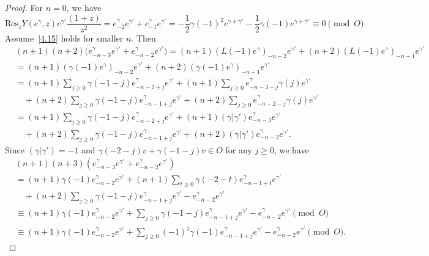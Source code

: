 \documentclass[10pt,a4paper]{amsart}
\def \ga {\gamma}
\def\Res{\mathrm{Res}}
\begin{document}
\begin{proof}
		For $n=0$, we have
		\[
		\Res_z Y(e^\ga,z)e^{\ga'}\frac{(1+z)}{z^{2}}
		= e^\ga_{-2}e^{\ga'}+e^\ga_{-1}e^{\ga'}
		= -\frac{1}{2}\ga(-1)^2e^{\ga+\ga'}-\frac{1}{2}\ga(-1)e^{\ga+\ga'}
		\equiv 0\pmod{O}.
		\]
		Assume~\eqref{4.15} holds for smaller $n$. Then
		\begin{align*}
			&(n+1)(n+2)\big(e^\ga_{-n-3}e^{\ga'}+e^\ga_{-n-2}e^{\ga'}\big)
			=(n+1)(L(-1)e^\ga)_{-n-2}e^{\ga'}+(n+2)(L(-1)e^\ga)_{-n-1}e^{\ga'}\\
			&=(n+1)(\ga(-1)e^\ga)_{-n-2}e^{\ga'}+(n+2)(\ga(-1)e^\ga)_{-n-1}e^{\ga'}\\
			&=(n+1)\!\sum_{j\geq 0}\!\ga(-1-j)e^\ga_{-n-2+j}e^{\ga'}
			+(n+1)\!\sum_{j\geq 0}\! e^\ga_{-n-3-j}\ga(j)e^{\ga'}\\
			&\quad+(n+2)\!\sum_{j\geq 0}\!\ga(-1-j)e^\ga_{-n-1+j}e^{\ga'}
			+(n+2)\!\sum_{j\geq 0}\! e^\ga_{-n-2-j}\ga(j)e^{\ga'}\\
			&=(n+1)\sum_{j\geq 0}\ga(-1-j)e^\ga_{-n-2+j}e^{\ga'}
			+(n+1)(\ga|\ga')e^{\ga}_{-n-3}e^{\ga'}\\
			&\quad+(n+2)\sum_{j\geq 0}\ga(-1-j)e^\ga_{-n-1+j}e^{\ga'}
			+(n+2)(\ga|\ga')e^{\ga}_{-n-2}e^{\ga'}.
		\end{align*}
		Since $(\ga|\ga')=-1$ and $\ga(-2-j)v+\ga(-1-j)v\in O$ for any $j\geq 0$, we have \begin{align*} &(n+1)(n+3)\left(e^\ga_{-n-3}e^{\ga'}+e^\ga_{-n-2}e^{\ga'}\right)\\
			&=(n+1)\ga(-1)e^\ga_{-n-2}e^{\ga'}+(n+1)\sum_{t\geq 0}\ga(-2-t)e^\ga_{-n-1+t}e^{\ga'}\\
			&\quad +(n+2)\sum_{j\geq 0} \ga(-1-j)e^\ga_{-n-1+j}e^{\ga'}-e^\ga_{-n-2}e^{\ga'}\\ &\equiv (n+1)\ga(-1)e^\ga_{-n-2}e^{\ga'}+\sum_{j\geq 0} \ga(-1-j) e^\ga_{-n-1+j}e^{\ga'}-e^\ga_{-n-2}e^{\ga'}\pmod{O}\\ &\equiv (n+1)\ga(-1)e^\ga_{-n-2}e^{\ga'}+\sum_{j\geq 0} (-1)^j\ga(-1) e^\ga_{-n-1+j}e^{\ga'}-e^\ga_{-n-2}e^{\ga'}\pmod{O}. 
		\end{align*}
		

\end{proof}
\end{document}
